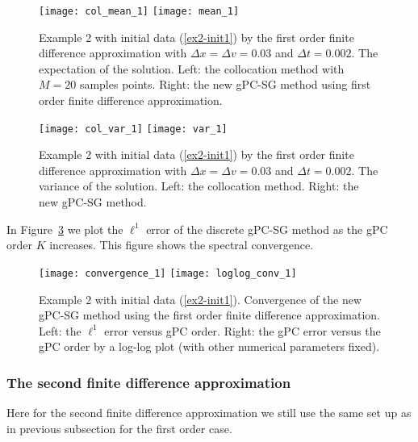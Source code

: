 \documentclass[12pt]{article}
\theoremstyle{plain}
\theoremstyle{remark}
\theoremstyle{remark}
\theoremstyle{remark}
\numberwithin{equation}{section}
\newcommand{\Dx}{\Delta x}
\newcommand{\Dt}{\Delta t}
\newcommand{\Dv}{\Delta v}
\begin{document}
\begin{figure}[htbp]
  \texttt{[image: col\_mean\_1]}
  \texttt{[image: mean\_1]}
  \caption{Example 2 with initial data (\ref{ex2-init1})  by the first order 
finite difference approximation  with $\Dx=\Dv=0.03$ and $\Dt=0.002$.  The expectation of the solution. Left: the collocation method with $M=20$ samples points. Right: the new gPC-SG method using first order finite difference approximation.}
  \label{6}
\end{figure}
\begin{figure}[htbp]
  \texttt{[image: col\_var\_1]}
  \texttt{[image: var\_1]}
  \caption{Example 2 with initial data (\ref{ex2-init1}) by the first order 
finite difference approximation  with $\Dx=\Dv=0.03$ and $\Dt=0.002$. The variance of the solution. Left: the collocation method. Right: the new gPC-SG 
method.}
  \label{15}
\end{figure} 

In Figure~\ref{7} we plot the $\ell^1$ error of the discrete gPC-SG method as the gPC order $K$ increases. This figure shows the spectral convergence.
\begin{figure}[htbp]
  \texttt{[image: convergence\_1]}
  \texttt{[image: loglog\_conv\_1]}
  \caption{Example 2 with initial data (\ref{ex2-init1}). Convergence of the new gPC-SG method using the first order finite difference approximation. Left: the $\ell^1$ error versus gPC order. Right: the gPC error versus the gPC order by a log-log plot (with other numerical parameters fixed).}
  \label{7}
\end{figure}






\subsubsection{The second finite difference approximation}
Here for the second finite difference approximation we still use the same set up as in previous subsection for the first order case. 
\end{document}
